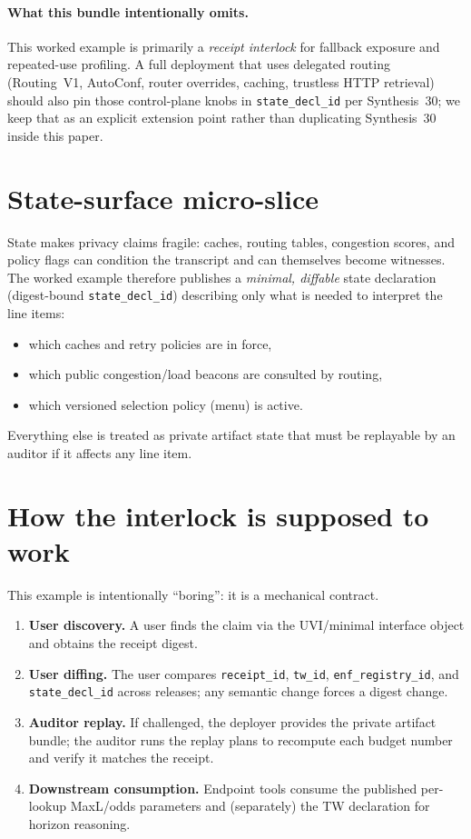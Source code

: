 \documentclass[11pt]{article}
\begin{document}
\paragraph{What this bundle intentionally omits.}
This worked example is primarily a \emph{receipt interlock} for fallback exposure and repeated-use profiling.
A full deployment that uses delegated routing (Routing~V1, AutoConf, router overrides, caching, trustless HTTP retrieval) should also pin those control-plane knobs in \texttt{state\_decl\_id} per Synthesis~30; we keep that as an explicit extension point rather than duplicating Synthesis~30 inside this paper.\cite{series:deployedsurfaces}

\section{State-surface micro-slice}
State makes privacy claims fragile: caches, routing tables, congestion scores, and policy flags can condition the transcript and can themselves become witnesses.\cite{series:state1}
The worked example therefore publishes a \emph{minimal, diffable} state declaration (digest-bound \texttt{state\_decl\_id}) describing only what is needed to interpret the line items:
\begin{itemize}[leftmargin=*]
\item which caches and retry policies are in force,
\item which public congestion/load beacons are consulted by routing,
\item which versioned selection policy (menu) is active.
\end{itemize}
Everything else is treated as private artifact state that must be replayable by an auditor if it affects any line item.\cite{series:planstateequiv,series:auditorreplay}

\section{How the interlock is supposed to work}
This example is intentionally ``boring'': it is a mechanical contract.
\begin{enumerate}[leftmargin=*]
\item \textbf{User discovery.} A user finds the claim via the UVI/minimal interface object and obtains the receipt digest.\cite{series:userminiface}
\item \textbf{User diffing.} The user compares \texttt{receipt\_id}, \texttt{tw\_id}, \texttt{enf\_registry\_id}, and \texttt{state\_decl\_id} across releases; any semantic change forces a digest change.\cite{series:receiptitems}
\item \textbf{Auditor replay.} If challenged, the deployer provides the private artifact bundle; the auditor runs the replay plans to recompute each budget number and verify it matches the receipt.\cite{series:auditorreplay}
\item \textbf{Downstream consumption.} Endpoint tools consume the published per-lookup MaxL/odds parameters and (separately) the TW declaration for horizon reasoning.\cite{series:endpointbridge,series:accountingrulebook}
\end{enumerate}
\end{document}
